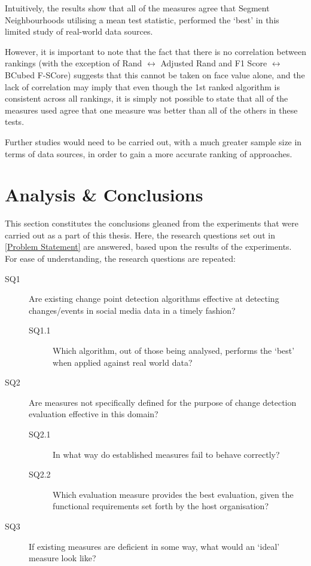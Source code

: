 \documentclass{uvamscse}	%
\begin{document}
Intuitively, the results show that all of the measures agree that Segment Neighbourhoods utilising a mean test statistic, performed the `best' in this limited study of real-world data sources.

However, it is important to note that the fact that there is no correlation between rankings (with the exception of Rand $\leftrightarrow$ Adjusted Rand and F1 Score $\leftrightarrow$ BCubed F-SCore) suggests that this cannot be taken on face value alone, and the lack of correlation may imply that even though the 1st ranked algorithm is consistent across all rankings, it is simply not possible to state that all of the measures used agree that one measure was better than all of the others in these tests.

Further studies would need to be carried out, with a much greater sample size in terms of data sources, in order to gain a more accurate ranking of approaches.


\chapter{Analysis \& Conclusions}
\label{conclusions}

This section constitutes the conclusions gleaned from the experiments that were carried out as a part of this thesis. Here, the research questions set out in \autoref{Problem Statement} are answered, based upon the results of the experiments. For ease of understanding, the research questions are repeated:

\begin{description}
	\item[SQ1] Are existing change point detection algorithms effective at detecting changes/events in social media data in a timely fashion?
	\begin{description}
	\item[SQ1.1] Which algorithm, out of those being analysed, performs the `best' when applied against real world data?
	\end{description}
	\item[SQ2] Are measures not specifically defined for the purpose of change detection evaluation effective in this domain?
	\begin{description}
	\item[SQ2.1] In what way do established measures fail to behave correctly?
    \item[SQ2.2] Which evaluation measure provides the best evaluation, given the functional requirements set forth by the host organisation?
    \end{description}
	\item[SQ3] If existing measures are deficient in some way, what would an `ideal' measure look like?
\end{description}
\end{document}
